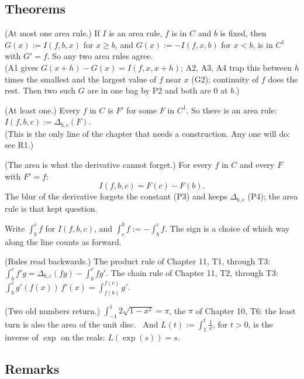 \subsection*{Theorems}

\begin{lines}
\item[\lab{T1}] (At most one area rule.) If $I$ is an area rule, $f$ is in $C$ and $b$ is fixed, then $G(x) := I(f, b, x)$ for $x \ge b$, and $G(x) := -I(f, x, b)$ for $x < b$, is in $C^1$ with $G' = f$. So any two area rules agree. \\
(A1 gives $G(x + h) - G(x) = I(f, x, x + h)$; A2, A3, A4 trap this between $h$ times the smallest and the largest value of $f$ near $x$ (G2); continuity of $f$ does the rest. Then two such $G$ are in one bag by P2 and both are $0$ at $b$.)
\item[\lab{T2}] (At least one.) Every $f$ in $C$ is $F'$ for some $F$ in $C^1$. So there is an area rule: $I(f, b, c) := \Delta_{b,c}(F)$. \\
(This is the only line of the chapter that needs a construction. Any one will do: see R1.)
\item[\lab{T3}] (The area is what the derivative cannot forget.) For every $f$ in $C$ and every $F$ with $F' = f$:
\[
I(f, b, c) = F(c) - F(b).
\]
The blur of the derivative forgets the constant (P3) and keeps $\Delta_{b,c}$ (P4); the area rule is that kept question.
\item[\lab{N1}] Write $\int_b^c f$ for $I(f, b, c)$, and $\int_c^b f := -\int_b^c f$. The sign is a choice of which way along the line counts as forward.
\item[\lab{T4}] (Rules read backwards.) The product rule of Chapter 11, T1, through T3: $\int_b^c f' g = \Delta_{b,c}(f g) - \int_b^c f g'$. The chain rule of Chapter 11, T2, through T3: $\int_b^c g'(f(x))\,f'(x) = \int_{f(b)}^{f(c)} g'$.
\item[\lab{T5}] (Two old numbers return.) $\int_{-1}^{1} 2\sqrt{1 - x^2} = \pi$, the $\pi$ of Chapter 10, T6: the least turn is also the area of the unit disc. \ And $L(t) := \int_1^t \tfrac{1}{x}$, for $t > 0$, is the inverse of $\exp$ on the reals: $L(\exp(s)) = s$.
\end{lines}

\subsection*{Remarks}

